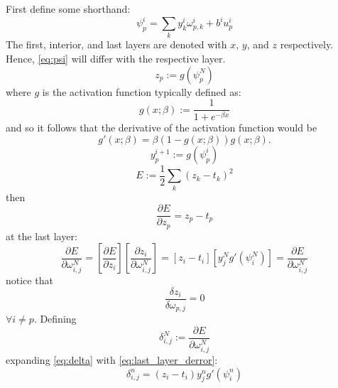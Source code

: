 \documentclass{article}
\begin{document}
First define some shorthand:
\begin{equation} \label{eq:psi}
\psi^i_p = \sum_{k} y_k^i \omega_{p,k}^i + b^iu_p^i
\end{equation}
%
The first, interior, and last layers are denoted with $x$, $y$, and $z$ respectively. Hence, \eqref{eq:psi} will differ with the respective layer.
%
\begin{equation} \label{eq:z}
z_p := g(\psi_p^N)
\end{equation}
%
where $g$ is the activation function typically defined as:
%
\begin{equation} \label{eq:g}
g(x;\beta) := \frac{1}{1 + e^{-\beta x}}
\end{equation}
%
and so it follows that the derivative of the activation function would be
%
\begin{equation} \label{eq:gp}
g'(x;\beta) = \beta \left( 1 - g(x;\beta) \right) g(x; \beta).
\end{equation}
%
\begin{equation} \label{eq:z}
y_p^{i+1} := g(\psi_p^i)
\end{equation}
%
\begin{equation} \label{eq:error}
E := \frac{1}{2} \sum_k (z_k - t_k)^2
\end{equation}
%
then
%
\begin{equation} \label{eq:derror}
\frac{\partial E}{\partial z_p} = z_p - t_p
\end{equation}
%
at the last layer:
%
\begin{equation} \label{eq:last_layer_derror}
\frac{\partial E}{\partial \omega_{i,j}^N} =
\left[ \frac{\partial E}{\partial z_i} \right] \left[ \frac{\partial z_i}{\partial \omega_{i, j}^N} \right] =
\left[ z_i - t_i \right] \left[ y_j^N g' (\psi_i^N) \right] =
\frac{\partial E}{\partial \omega_{i,j}^N}
\end{equation}
%
notice that
%
\begin{equation} \label{eq:last_layer_derror_eq_0}
\frac{\delta z_i}{\delta \omega_{p,j}} = 0
\end{equation}
%
$\forall i \neq p$. Defining
%
\begin{equation} \label{eq:delta}
\delta_{i,j}^N := \frac{\partial E}{\partial \omega_{i,j}^N}
\end{equation}
%
expanding \eqref{eq:delta} with \eqref{eq:last_layer_derror}:
%
\begin{equation} \label{eq:delta_full}
\delta_{i,j}^n = 
\left ( z_i - t_i \right ) y_j^n g' (\psi_i^n)
\end{equation}
\end{document}
